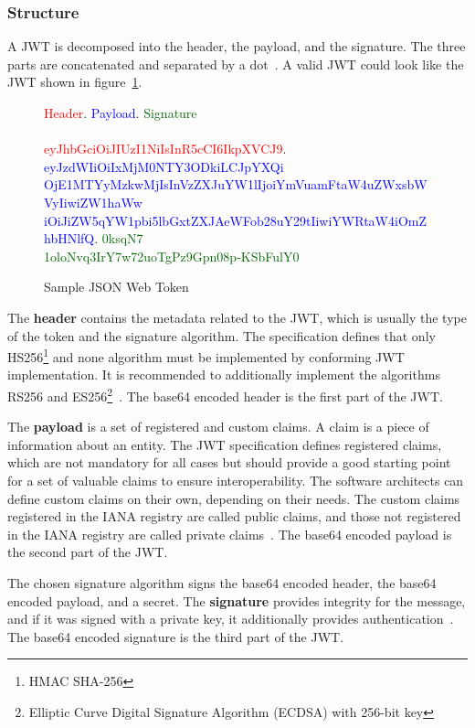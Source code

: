 \subsubsection{Structure}
A JWT is decomposed into the header, the payload, and the signature.
The three parts are concatenated and separated by a dot~\cite{jwtdocauth0}.
A valid JWT could look like the JWT shown in figure~\ref{fig:myjwt}.
\begin{figure}
    \textcolor{red}{Header}.
	\textcolor{blue}{Payload}.
	\textcolor{darkgreen}{Signature} \\ \\
    \textcolor{red}{eyJhbGciOiJIUzI1NiIsInR5cCI6IkpXVCJ9}.
	\textcolor{blue}{eyJzdWIiOiIxMjM0NTY3ODkiLCJpYXQi\\OjE1MTYyMzkwMjIsInVzZXJuYW1lIjoiYmVuamFtaW4uZWxsbWVyIiwiZW1haWw\\iOiJiZW5qYW1pbi5lbGxtZXJAeWFob28uY29tIiwiYWRtaW4iOmZhbHNlfQ}.
	\textcolor{darkgreen}{0ksqN7\\1oloNvq3IrY7w72uoTgPz9Gpn08p-KSbFulY0}
    \caption{Sample JSON Web Token}
    \label{fig:myjwt}
\end{figure}

The \textbf{header} contains the metadata related to the JWT, which is usually the type of the token and the signature algorithm.
The specification defines that only HS256\footnote{HMAC SHA-256} and none algorithm must be implemented by conforming JWT implementation.
It is recommended to additionally implement the algorithms RS256 and ES256\footnote{Elliptic Curve Digital Signature Algorithm (ECDSA) with 256-bit key}~\cite{jwtdocauth0, jwtrfc}.
The base64 encoded header is the first part of the JWT.

The \textbf{payload} is a set of registered and custom claims.
A claim is a piece of information about an entity.
The JWT specification defines registered claims, which are not mandatory for all cases but should provide a good starting point for a set of valuable claims to ensure interoperability.
The software architects can define custom claims on their own, depending on their needs.
The custom claims registered in the IANA registry are called public claims, and those not registered in the IANA registry are called private claims~\cite{jwtdocauth0, jwtrfc}.
The base64 encoded payload is the second part of the JWT.

The chosen signature algorithm signs the base64 encoded header, the base64 encoded payload, and a secret.
The \textbf{signature} provides integrity for the message, and if it was signed with a private key, it additionally provides authentication~\cite{jwtdocauth0}.
The base64 encoded signature is the third part of the JWT.

